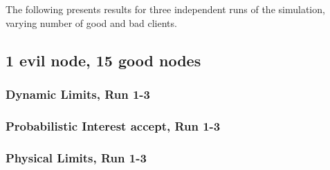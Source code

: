 \documentclass[onecolumn]{IEEEtran}
\begin{document}
The following presents results for three independent runs of the simulation, varying number of good and bad clients.  

\clearpage
\subsection{\textbf{1 evil node}, 15 good nodes}

\subsubsection{Dynamic Limits, Run 1-3}

\begin{minipage}[b]{\textwidth}

\end{minipage}

\clearpage

\subsubsection{Probabilistic Interest accept, Run 1-3}

\begin{minipage}[b]{\textwidth}

\end{minipage}

\clearpage

\subsubsection{Physical Limits, Run 1-3}

\begin{minipage}[b]{\textwidth}

\end{minipage}



% 
\end{document}
